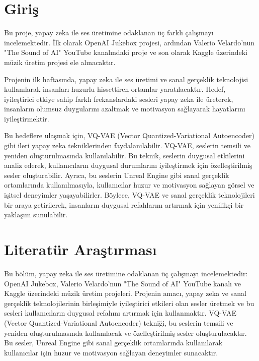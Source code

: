 \documentclass[12pt, a4paper]{article}
\begin{document}
	\section{Giriş}
	\vspace*{1\baselineskip}
	\raggedright Bu proje, yapay zeka ile ses üretimine odaklanan üç farklı çalışmayı incelemektedir. İlk olarak OpenAI Jukebox projesi, ardından Valerio Velardo'nun "The Sound of AI" YouTube kanalındaki proje ve son olarak Kaggle üzerindeki müzik üretim projesi ele alınacaktır.
	
	Projenin ilk haftasında, yapay zeka ile ses üretimi ve sanal gerçeklik teknolojisi kullanılarak insanları huzurlu hissettiren ortamlar yaratılacaktır. Hedef, iyileştirici etkiye sahip farklı frekanslardaki sesleri yapay zeka ile üreterek, insanların olumsuz duygularını azaltmak ve motivasyon sağlayarak hayatlarını iyileştirmektir.
	
	Bu hedeflere ulaşmak için, VQ-VAE (Vector Quantized-Variational Autoencoder) gibi ileri yapay zeka tekniklerinden faydalanılabilir. VQ-VAE, seslerin temsili ve yeniden oluşturulmasında kullanılabilir. Bu teknik, seslerin duygusal etkilerini analiz ederek, kullanıcıların duygusal durumlarını iyileştirmek için özelleştirilmiş sesler oluşturabilir. Ayrıca, bu seslerin Unreal Engine gibi sanal gerçeklik ortamlarında kullanılmasıyla, kullanıcılar huzur ve motivasyon sağlayan görsel ve işitsel deneyimler yaşayabilirler. Böylece, VQ-VAE ve sanal gerçeklik teknolojileri bir araya getirilerek, insanların duygusal refahlarını artırmak için yenilikçi bir yaklaşım sunulabilir.
	
	\section{Literatür Araştırması}
	Bu bölüm, yapay zeka ile ses üretimine odaklanan üç çalışmayı incelemektedir: OpenAI Jukebox, Valerio Velardo'nun "The Sound of AI" YouTube kanalı ve Kaggle üzerindeki müzik üretim projeleri. Projenin amacı, yapay zeka ve sanal gerçeklik teknolojilerinin birleşimiyle iyileştirici etkileri olan sesler üretmek ve bu sesleri kullanıcıların duygusal refahını artırmak için kullanmaktır. VQ-VAE (Vector Quantized-Variational Autoencoder) tekniği, bu seslerin temsili ve yeniden oluşturulmasında kullanılacak ve özelleştirilmiş sesler oluşturulacaktır. Bu sesler, Unreal Engine gibi sanal gerçeklik ortamlarında kullanılarak kullanıcılar için huzur ve motivasyon sağlayan deneyimler sunacaktır.
	
\end{document}
